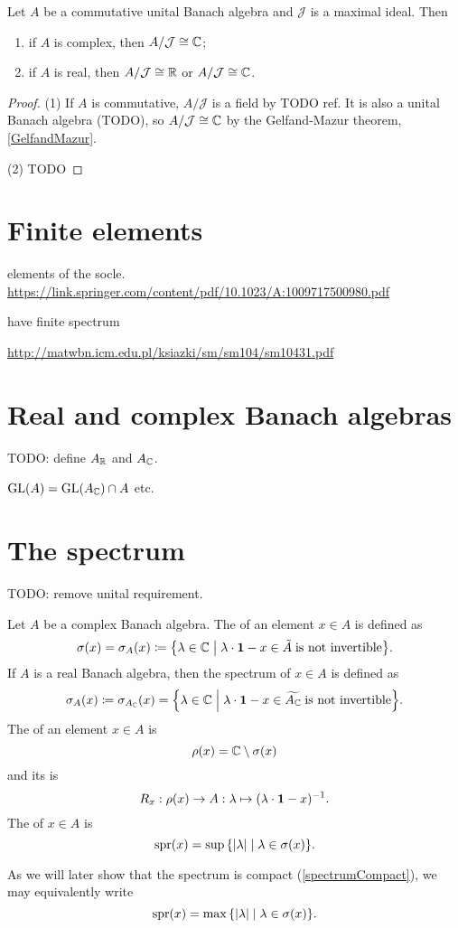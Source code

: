 \begin{proposition} \label{commutativeBanachAlgebraIdeals}
Let $A$ be a commutative unital Banach algebra and $\mathcal{J}$ is a maximal ideal. Then 
\begin{enumerate}
\item if $A$ is complex, then $A/\mathcal{J} \cong \mathbb{C}$;
\item if $A$ is real, then $A/\mathcal{J} \cong \mathbb{R}$ or $A/\mathcal{J} \cong \mathbb{C}$.
\end{enumerate}
\end{proposition}
\begin{proof}
(1) If $A$ is commutative, $A/\mathcal{J}$ is a field by TODO ref. It is also a unital Banach algebra (TODO), so $A/\mathcal{J} \cong \mathbb{C}$ by the Gelfand-Mazur theorem, \ref{GelfandMazur}.

(2) TODO
\end{proof}

\section{Finite elements}
elements of the socle. \url{https://link.springer.com/content/pdf/10.1023/A:1009717500980.pdf}

have finite spectrum 

\url{http://matwbn.icm.edu.pl/ksiazki/sm/sm104/sm10431.pdf}

\section{Real and complex Banach algebras}
TODO: define $A_{\mathbb{R}}$ and $A_{\mathbb{C}}$.

\begin{proposition} \label{preservationAlgebraicPropertiesComplexificationRealification}
$\operatorname{GL}(A) = \operatorname{GL}(A_{\mathbb{C}})\cap A$ etc.
\end{proposition}

\section{The spectrum}
TODO: remove unital requirement.
\begin{definition}
Let $A$ be a complex Banach algebra. The  of an element $x\in A$ is defined as
\[ \spec(x) = \spec_A(x) \defeq \setbuilder{\lambda\in\C}{\lambda\cdot \vec{1} - x \in \tilde{A} \;\text{is not invertible}}. \]
If $A$ is a real Banach algebra, then the spectrum of $x\in A$ is defined as
\[ \spec_A(x) \defeq \spec_{A_\C}(x) = \setbuilder{\lambda\in\C}{\lambda\cdot \vec{1} - x \in \widetilde{A_\C} \;\text{is not invertible}}.  \]
The  of an element $x\in A$ is
\[ \rho(x) = \mathbb{C}\setminus\sigma(x) \]
and its  is
\[ R_x: \rho(x) \to A : \lambda\mapsto (\lambda\cdot\boldsymbol{\mathrm{1}}  - x)^{-1}. \]
The  of $x\in A$ is
\[ \spr(x) = \sup\setbuilder{|\lambda|}{\lambda\in\spec(x)}. \]
\end{definition}
As we will later show that the spectrum is compact (\ref{spectrumCompact}), we may equivalently write
\[ \spr(x) = \max\setbuilder{|\lambda|}{\lambda\in\spec(x)}. \]

